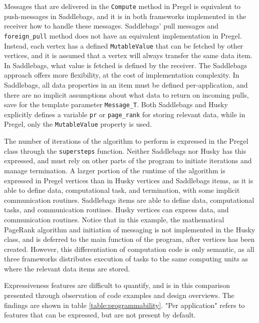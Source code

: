 \documentclass{uit-report}
\begin{document}
Messages that are delivered in the \texttt{Compute} method in Pregel is equivalent to push-messages in Saddlebags, and it is in both frameworks implemented in the receiver how to handle these messages. Saddlebags' pull messages and \texttt{foreign\_pull} method does not have an equivalent implementation in Pregel. Instead, each vertex has a defined \texttt{MutableValue} that can be fetched by other vertices, and it is assumed that a vertex will always transfer the same data item. In Saddlebags, what value is fetched is defined by the receiver. The Saddlebags approach offers more flexibility, at the cost of implementation complexity. In Saddlebags, all data properties in an item must be defined per-application, and there are no implicit assumptions about what data to return on incoming pulls, save for the template parameter \texttt{Message\_T}. Both Saddlebags and Husky explicitly defines a variable \texttt{pr} or \texttt{page\_rank} for storing relevant data, while in Pregel, only the \texttt{MutableValue} property is used.

The number of iterations of the algorithm to perform is expressed in the Pregel class through the \texttt{supersteps} function. Neither Saddlebags nor Husky has this expressed, and must rely on other parts of the program to initiate iterations and manage termination. A larger portion of the runtime of the algorithm is expressed in Pregel vertices than in Husky vertices and Saddlebags items, as it is able to define data, computational task, and termination, with some implicit communication routines. Saddlebags items are able to define data, computational tasks, and communication routines. Husky vertices can express data, and communication routines. Notice that in this example, the mathematical PageRank algorithm and initiation of messaging is not implemented in the Husky class, and is deferred to the main function of the program, after vertices has been created. However, this differentiation of computation code is only semantic, as all three frameworks distributes execution of tasks to the same computing units as where the relevant data items are stored.

Expressiveness features are difficult to quantify, and is in this comparison presented through observation of code examples and design overviews. The findings are shown in table \ref{table:programmability}. "Per application" refers to features that can be expressed, but are not present by default.
\end{document}
